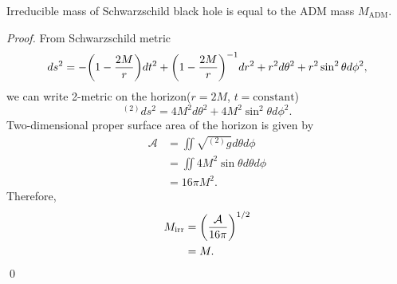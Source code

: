 \begin{example}
Irreducible mass of Schwarzschild black hole is equal to the ADM mass $M_\mathrm{ADM}$.
\end{example}
\begin{proof}
From Schwarzschild metric
\begin{equation}
	ds^2 = -\qty(1 - \frac{2M}{r}) dt^2 + \qty(1 - \frac{2M}{r})^{-1} dr^2 + r^2 d\theta^2 + r^2\sin^2 \theta d\phi^2,
\end{equation}
we can write 2-metric on the horizon($r=2M$, $t=\mathrm{constant}$)
\begin{equation}
	{}^{(2)}ds^2 = 4M^2 d\theta^2 + 4M^2 \sin^2 \theta d\phi^2.
\end{equation}
Two-dimensional proper surface area of the horizon is given by
\begin{align}
	\mathcal{A} &= \iint \sqrt{{}^{(2)} g}d\theta d\phi\\
	&= \iint 4M^2\sin \theta d\theta d\phi\\
	&= 16\pi M^2.
\end{align}
Therefore,
\begin{align}
	M_\mathrm{irr} &= \qty(\frac{\mathcal{A}}{16\pi})^{1/2}\\
	&= M.
\end{align}
\qed
\end{proof}

